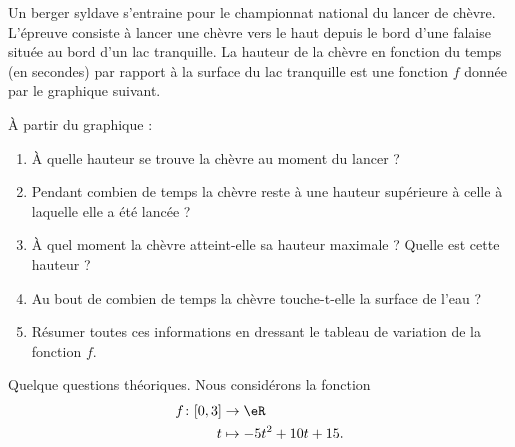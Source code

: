 
\begin{exercice}\label{exosmath-0238}

    Un berger syldave s'entraine pour le championnat national du lancer de chèvre. L'épreuve consiste à lancer une chèvre vers le haut depuis le bord d'une falaise située au bord d'un lac tranquille. La hauteur de la chèvre en fonction du temps (en secondes) par rapport à la surface du lac tranquille est une fonction \( f\) donnée par le graphique suivant.

    \begin{center}

    \end{center}
    À partir du graphique :
    \begin{enumerate}
        \item
            À quelle hauteur se trouve la chèvre au moment du lancer ?
        \item
            Pendant combien de temps la chèvre reste à une hauteur supérieure à celle à laquelle elle a été lancée ?
        \item
            À quel moment la chèvre atteint-elle sa hauteur maximale ? Quelle est cette hauteur ?
        \item
            Au bout de combien de temps la chèvre touche-t-elle la surface de l'eau ?
        \item
            Résumer toutes ces informations en dressant le tableau de variation de la fonction \( f\).
    \end{enumerate}
    Quelque questions théoriques. Nous considérons la fonction
            \begin{equation}
                \begin{aligned}
                    f\colon \mathopen[ 0 , 3 \mathclose]&\to \eR \\
                    t&\mapsto -5t^2+10t+15. 
                \end{aligned}
            \end{equation}
            

\end{exercice}
